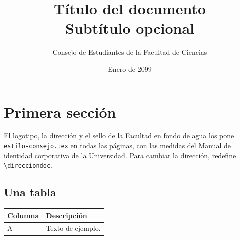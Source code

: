 \documentclass[a4paper,11pt]{article}
\newcommand{\titulo}{Título del documento}
\newcommand{\subtitulo}{Subtítulo opcional}
\newcommand{\autor}{Consejo de Estudiantes de la Facultad de Ciencias}
\newcommand{\fecha}{Enero de 2099}
\begin{document}
\title{\bfseries\fontsize{21pt}{24pt}\selectfont \color{DeleAzul}\titulo\\[4pt]\textcolor{DarkGray3}{\fontsize{14pt}{16pt}\selectfont \subtitulo}}
\author{\vspace{-0.5cm}\autor}
\date{\vspace{-0.5cm}\small\fecha}
\maketitle
\thispagestyle{fancy}

\section{Primera sección}
El logotipo, la dirección y el sello de la Facultad en fondo de agua los pone
\texttt{estilo-consejo.tex} en todas las páginas, con las medidas del Manual de
identidad corporativa de la Universidad. Para cambiar la dirección, redefine
\verb|\direcciondoc|.

\subsection{Una tabla}
\begin{tabularx}{\linewidth}{lX}
\toprule
Columna & Descripción\\
\midrule
A & Texto de ejemplo.\\
\bottomrule
\end{tabularx}
\end{document}
